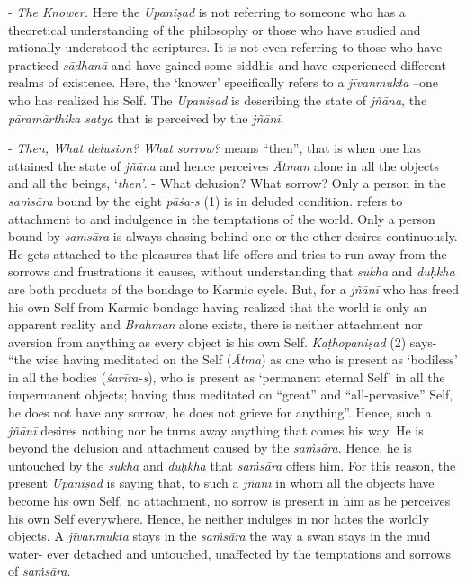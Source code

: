- \emph{The Knower.} Here the \emph{Upaniṣad} is not referring to someone who has a theoretical understanding of the philosophy or those who have studied and rationally understood the scriptures. It is not even referring to those who have practiced \emph{sādhanā} and have gained some siddhis and have experienced different realms of existence. Here, the `knower' specifically refers to a \emph{jīvanmukta} --one who has realized his Self. The \emph{Upaniṣad} is describing the state of \emph{jñāna}, the \emph{pāramārthika satya} that is perceived by the \emph{jñānī}.

- \emph{Then, What delusion? What sorrow?}  means ``then'', that is when one has attained the state of \emph{jñāna} and hence perceives \emph{Ātman} alone in all the objects and all the beings, `\emph{then'}. - What delusion? What sorrow? Only a person in the \emph{saṁsāra} bound by the eight \emph{pāśa-s} (1) is in deluded condition.  refers to attachment to and indulgence in the temptations of the world. Only a person bound by \emph{saṁsāra} is always chasing behind one or the other desires continuously. He gets attached to the pleasures that life offers and tries to run away from the sorrows and frustrations it causes, without understanding that \emph{sukha} and \emph{duḥkha} are both products of the bondage to Karmic cycle. But, for a \emph{jñānī} who has freed his own-Self from Karmic bondage having realized that the world is only an apparent reality and \emph{Brahman} alone exists, there is neither attachment nor aversion from anything as every object is his own Self. \emph{Kaṭhopaniṣad} (2) says- ``the wise having meditated on the Self (\emph{Ātma}) as one who is present as `bodiless' in all the bodies (\emph{śarīra-s}), who is present as `permanent eternal Self' in all the impermanent objects; having thus meditated on ``great'' and ``all-pervasive'' Self, he does not have any sorrow, he does not grieve for anything''. Hence, such a \emph{jñānī} desires nothing nor he turns away anything that comes his way. He is beyond the delusion and attachment caused by the \emph{saṁsāra}. Hence, he is untouched by the \emph{sukha} and \emph{duḥkha} that \emph{saṁsāra} offers him. For this reason, the present \emph{Upaniṣad} is saying that, to such a \emph{jñānī} in whom all the objects have become his own Self, no attachment, no sorrow is present in him as he perceives his own Self everywhere. Hence, he neither indulges in nor hates the worldly objects. A \emph{jīvanmukta} stays in the \emph{saṁsāra} the way a swan stays in the mud water- ever detached and untouched, unaffected by the temptations and sorrows of \emph{saṁsāra}.

